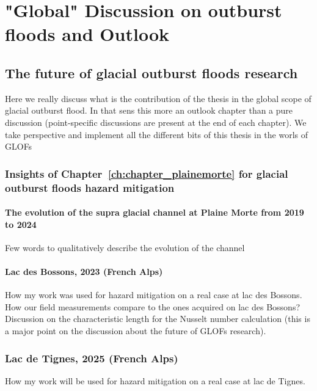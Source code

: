 \chapter{"Global" Discussion on outburst floods and Outlook}
\label{ch:discussion}

\section{The future of glacial outburst floods research}

Here we really discuss what is the contribution of the thesis in the global scope of glacial outburst flood. In that sens this more an outlook chapter than a pure discussion (point-specific discussions are present at the end of each chapter). We take perspective and implement all the different bits of this thesis in the worls of GLOFs

\subsection{Insights of Chapter~\ref{ch:chapter_plainemorte} for glacial outburst floods hazard mitigation}

\subsubsection{The evolution of the supra glacial channel at Plaine Morte from 2019 to 2024}

Few words to qualitatively describe the evolution of the channel

\subsubsection{Lac des Bossons, 2023 (French Alps)}

How my work was used for hazard mitigation on a real case at lac des Bossons. How our field measurements compare to the ones acquired on lac des Bossons? Discussion on the characteristic length for the Nusselt number calculation (this is a major point on the discussion about the future of GLOFs research). 

\subsection{Lac de Tignes, 2025 (French Alps)}

How my work will be used for hazard mitigation on a real case at lac de Tignes.


